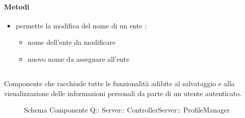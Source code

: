 \paragraph{Metodi}
\begin{itemize}
\item {}
\newline
permette la modifica del nome di un ente
\newline
{} :
\begin{itemize}
\item {}
\newline
nome dell'ente da modificare
\item {}
\newline
nuovo nome da assegnare all'ente
\end{itemize}
\end{itemize}
\subsection{}
Componente che racchiude tutte le funzionalità adibite al salvataggio e alla visualizzazione delle informazioni personali da parte di un utente autenticato.
\begin{figure}[H]
\centering
\noindent{}
\caption[Schema Componente Quizzipedia::Server::ControllerServer::ProfileManager]{Schema Componente Q:: Server:: ControllerServer:: ProfileManager}
\end{figure}
